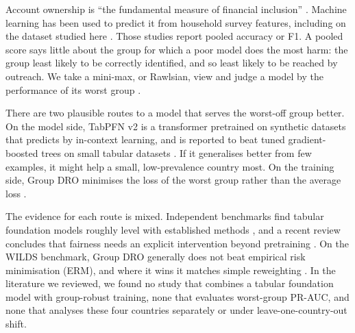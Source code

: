 \documentclass[11pt]{article}
\begin{document}
Account ownership is ``the fundamental measure of financial inclusion'' \citep[p.~27]{demirguckunt2022findex}. Machine learning has been used to predict it from household survey features, including on the dataset studied here \citep{ismail2021using, balde2022efficient}. Those studies report pooled accuracy or F1. A pooled score says little about the group for which a poor model does the most harm: the group least likely to be correctly identified, and so least likely to be reached by outreach. We take a mini-max, or Rawlsian, view and judge a model by the performance of its worst group \citep[pp.~4--5]{barrainkua2025preserving}.

There are two plausible routes to a model that serves the worst-off group better. On the model side, TabPFN v2 is a transformer pretrained on synthetic datasets that predicts by in-context learning, and is reported to beat tuned gradient-boosted trees on small tabular datasets \citep{hollmann2025accurate}. If it generalises better from few examples, it might help a small, low-prevalence country most. On the training side, Group DRO minimises the loss of the worst group rather than the average loss \citep{ghosal2023distributionally, stahlschmidt2024domain}.

The evidence for each route is mixed. Independent benchmarks find tabular foundation models roughly level with established methods \citep{shaktah2026established}, and a recent review concludes that fairness needs an explicit intervention beyond pretraining \citep[pp.~22--23]{kurashkin2026current}. On the WILDS benchmark, Group DRO generally does not beat empirical risk minimisation (ERM), and where it wins it matches simple reweighting \citep[pp.~20--22, 92]{koh2021wilds}. In the literature we reviewed, we found no study that combines a tabular foundation model with group-robust training, none that evaluates worst-group PR-AUC, and none that analyses these four countries separately or under leave-one-country-out shift.
\end{document}
